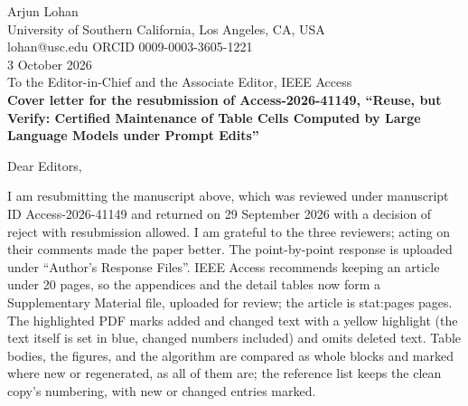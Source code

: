 \documentclass[10.5pt]{article}
\begin{document}
Arjun Lohan\\
University of Southern California, Los Angeles, CA, USA\\
lohan@usc.edu \quad ORCID 0009-0003-3605-1221\\[0.4em]
3 October 2026\\[0.8em]
To the Editor-in-Chief and the Associate Editor, IEEE Access\\[0.6em]
\textbf{Cover letter for the resubmission of Access-2026-41149, ``Reuse, but Verify: Certified Maintenance of Table Cells Computed by Large Language Models under Prompt Edits''}

Dear Editors,

I am resubmitting the manuscript above, which was reviewed under manuscript ID Access-2026-41149 and returned on 29 September 2026 with a decision of reject with resubmission allowed. I am grateful to the three reviewers; acting on their comments made the paper better. The point-by-point response is uploaded under ``Author's Response Files''. IEEE Access recommends keeping an article under 20 pages, so the appendices and the detail tables now form a Supplementary Material file, uploaded for review; the article is {{stat:pages}} pages. The highlighted PDF marks added and changed text with a yellow highlight (the text itself is set in blue, changed numbers included) and omits deleted text. Table bodies, the figures, and the algorithm are compared as whole blocks and marked where new or regenerated, as all of them are; the reference list keeps the clean copy's numbering, with new or changed entries marked.
\end{document}

